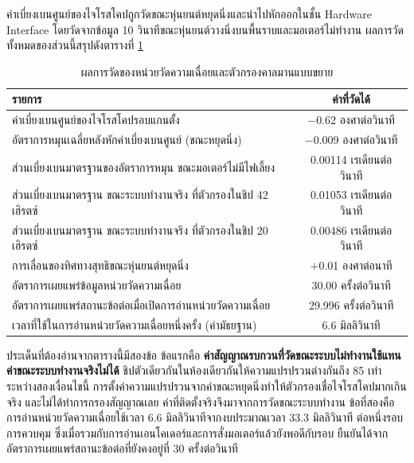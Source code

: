 \documentclass[a4paper,12pt]{report}
\begin{document}
ค่าเบี่ยงเบนศูนย์ของไจโรสโคปถูกวัดขณะหุ่นยนต์หยุดนิ่งและนำไปหักออกในชั้น Hardware Interface
โดยวัดจากข้อมูล 10 วินาทีขณะหุ่นยนต์วางนิ่งบนพื้นราบและมอเตอร์ไม่ทำงาน
ผลการวัดทั้งหมดของส่วนนี้สรุปดังตารางที่ \ref{tab:imuresult}

\begin{table}[htbp]
\centering
\caption[ผลการวัดของหน่วยวัดความเฉื่อยและตัวกรองคาลมานแบบขยาย (บทที่ 4)]{ผลการวัดของหน่วยวัดความเฉื่อยและตัวกรองคาลมานแบบขยาย}
\label{tab:imuresult}
\small
\begin{tabularx}{\textwidth}{|X|c|}
\hline
\textbf{รายการ} & \textbf{ค่าที่วัดได้} \\
\hline
ค่าเบี่ยงเบนศูนย์ของไจโรสโคปรอบแกนตั้ง & $-$0.62 องศาต่อวินาที \\
\hline
อัตราการหมุนเฉลี่ยหลังหักค่าเบี่ยงเบนศูนย์ (ขณะหยุดนิ่ง) & $-$0.009 องศาต่อวินาที \\
\hline
ส่วนเบี่ยงเบนมาตรฐานของอัตราการหมุน ขณะมอเตอร์ไม่มีไฟเลี้ยง & 0.00114 เรเดียนต่อวินาที \\
\hline
ส่วนเบี่ยงเบนมาตรฐาน ขณะระบบทำงานจริง ที่ตัวกรองในชิป 42 เฮิรตซ์ & 0.01053 เรเดียนต่อวินาที \\
\hline
ส่วนเบี่ยงเบนมาตรฐาน ขณะระบบทำงานจริง ที่ตัวกรองในชิป 20 เฮิรตซ์ & 0.00486 เรเดียนต่อวินาที \\
\hline
การเลื่อนของทิศทางสุทธิขณะหุ่นยนต์หยุดนิ่ง & $+$0.01 องศาต่อนาที \\
\hline
อัตราการเผยแพร่ข้อมูลหน่วยวัดความเฉื่อย & 30.00 ครั้งต่อวินาที \\
\hline
อัตราการเผยแพร่สถานะข้อต่อเมื่อเปิดการอ่านหน่วยวัดความเฉื่อย & 29.996 ครั้งต่อวินาที \\
\hline
เวลาที่ใช้ในการอ่านหน่วยวัดความเฉื่อยหนึ่งครั้ง (ค่ามัธยฐาน) & 6.6 มิลลิวินาที \\
\hline
\end{tabularx}
\end{table}

ประเด็นที่ต้องอ่านจากตารางนี้มีสองข้อ
ข้อแรกคือ \textbf{ค่าสัญญาณรบกวนที่วัดขณะระบบไม่ทำงานใช้แทนค่าขณะระบบทำงานจริงไม่ได้}
ชิปตัวเดียวกันในห้องเดียวกันให้ความแปรปรวนต่างกันถึง 85 เท่าระหว่างสองเงื่อนไขนี้
การตั้งค่าความแปรปรวนจากค่าขณะหยุดนิ่งทำให้ตัวกรองเชื่อไจโรสโคปมากเกินจริง
และไม่ได้ทำการกรองสัญญาณเลย ค่าที่ติดตั้งจริงจึงมาจากการวัดขณะระบบทำงาน
ข้อที่สองคือการอ่านหน่วยวัดความเฉื่อยใช้เวลา 6.6 มิลลิวินาทีจากงบประมาณเวลา 33.3 มิลลิวินาที
ต่อหนึ่งรอบการควบคุม ซึ่งเมื่อรวมกับการอ่านเอนโคเดอร์และการสั่งมอเตอร์แล้วยังพอดีกับรอบ
ยืนยันได้จากอัตราการเผยแพร่สถานะข้อต่อที่ยังคงอยู่ที่ 30 ครั้งต่อวินาที
\end{document}
